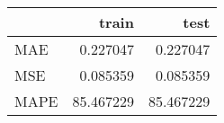 \begin{tabular}{lrr}
\toprule
{} &      train &       test \\
\midrule
MAE  &   0.227047 &   0.227047 \\
MSE  &   0.085359 &   0.085359 \\
MAPE &  85.467229 &  85.467229 \\
\bottomrule
\end{tabular}
